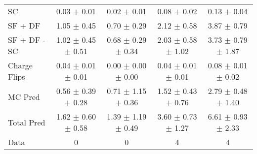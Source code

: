 \begin{tabular}{l|cccc}
                                 SC &  0.03 $\pm$  0.01 &  0.02 $\pm$  0.01 &  0.08 $\pm$  0.02 &  0.13 $\pm$  0.04 \\
                            SF + DF &  1.05 $\pm$  0.45 &  0.70 $\pm$  0.29 &  2.12 $\pm$  0.58 &  3.87 $\pm$  0.79 \\
\hline
                       SF + DF - SC &  1.02 $\pm$  0.45 $\pm$  0.51 &  0.68 $\pm$  0.29 $\pm$  0.34 &  2.03 $\pm$  0.58 $\pm$  1.02 &  3.73 $\pm$  0.79 $\pm$  1.87 \\
\hline\hline
                       Charge Flips &  0.04 $\pm$  0.01 $\pm$  0.01 &  0.00 $\pm$  0.00 $\pm$  0.00 &  0.04 $\pm$  0.01 $\pm$  0.01 &  0.08 $\pm$  0.01 $\pm$  0.02 \\
\hline
                            MC Pred &  0.56 $\pm$  0.39 $\pm$  0.28 &  0.71 $\pm$  1.15 $\pm$  0.36 &  1.52 $\pm$  0.43 $\pm$  0.76 &  2.79 $\pm$  0.48 $\pm$  1.40 \\
\hline
                         Total Pred &  1.62 $\pm$  0.60 $\pm$  0.58 &  1.39 $\pm$  1.19 $\pm$  0.49 &  3.60 $\pm$  0.73 $\pm$  1.27 &  6.61 $\pm$  0.93 $\pm$  2.33 \\
\hline\hline
                               Data &     0 &     0 &     4 &     4 \\
\hline\hline
\end{tabular}


